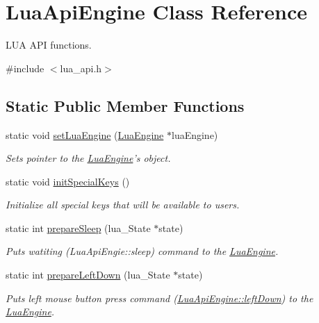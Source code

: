 \hypertarget{class_lua_api_engine}{\section{Lua\-Api\-Engine Class Reference}
\label{class_lua_api_engine}
}


L\-U\-A A\-P\-I functions.  




{\ttfamily \#include $<$lua\-\_\-api.\-h$>$}

\subsection*{Static Public Member Functions}
\begin{DoxyCompactItemize}
\item 
static void \hyperlink{class_lua_api_engine_ae3642a4f6256f202dd88726b70ed3936}{set\-Lua\-Engine} (\hyperlink{class_lua_engine}{Lua\-Engine} $\ast$lua\-Engine)
\begin{DoxyCompactList}\small\item\em Sets pointer to the \hyperlink{class_lua_engine}{Lua\-Engine}'s object. \end{DoxyCompactList}\item 
static void \hyperlink{class_lua_api_engine_a7f614e9a85e02951c0a21e694654b83a}{init\-Special\-Keys} ()
\begin{DoxyCompactList}\small\item\em Initialize all special keys that will be available to users. \end{DoxyCompactList}\item 
static int \hyperlink{class_lua_api_engine_a03308524bb7be3fca0e5865a0eba6c41}{prepare\-Sleep} (lua\-\_\-\-State $\ast$state)
\begin{DoxyCompactList}\small\item\em Puts watiting (Lua\-Api\-Engie\-::sleep) command to the \hyperlink{class_lua_engine}{Lua\-Engine}. \end{DoxyCompactList}\item 
static int \hyperlink{class_lua_api_engine_a5e6c9c1b66d19a4f65d6c65d6ae849a2}{prepare\-Left\-Down} (lua\-\_\-\-State $\ast$state)
\begin{DoxyCompactList}\small\item\em Puts left mouse button press command (\hyperlink{class_lua_api_engine_a5942498f999031601960d890b259536b}{Lua\-Api\-Engine\-::left\-Down}) to the \hyperlink{class_lua_engine}{Lua\-Engine}. \end{DoxyCompactList}\item 

\end{DoxyCompactItemize}
